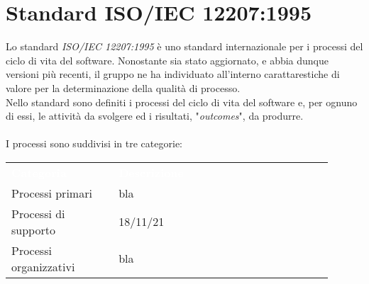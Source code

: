 \section{Standard ISO/IEC 12207:1995}
Lo standard \textit{ISO/IEC 12207:1995} è uno standard 
internazionale per i processi del ciclo di vita del software.
Nonostante sia stato aggiornato, e abbia dunque versioni più recenti, il gruppo
ne ha individuato all'interno carattarestiche di valore per la determinazione
della qualità di processo.\\
\noindent
Nello standard sono definiti i processi del ciclo di vita del 
software e, per ognuno di essi, le attività da svolgere ed i
risultati, "\textit{outcomes}", da produrre.\\ \\
\noindent 
I processi sono suddivisi in tre categorie:\\

\begin{tabular}{p{0.30\linewidth}p{0.60\linewidth}}
	\rowcolor[RGB]{33, 73, 50}
	\textcolor{white}{\textbf{Categoria}} & \textcolor{white}{\textbf{Descrizione}}\\
	\rowcolor[RGB]{216, 235, 171}
	Processi primari & bla \\
	\rowcolor[RGB]{233, 245, 206}
	Processi di supporto & 18/11/21 \\
    \rowcolor[RGB]{216, 235, 171}
	Processi organizzativi & bla \\
\end{tabular}